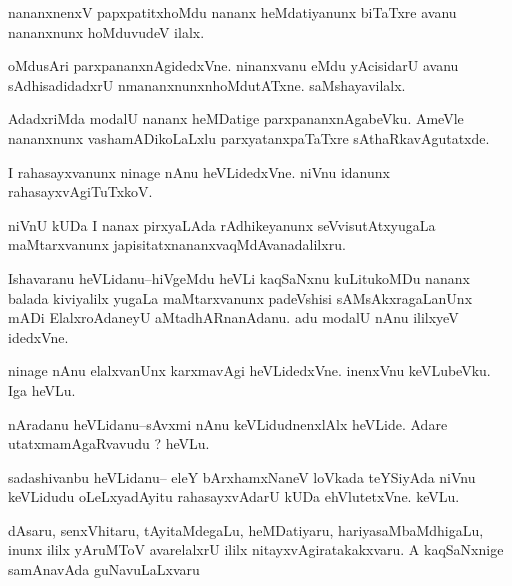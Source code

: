 \documentclass{article}
\begin{document}
\begin{mn}%
nananxnenxV papxpatitxhoMdu nananx heMdatiyanunx biTaTxre avanu nananxnunx hoMduvudeV ilalx.
\end{mn}

\begin{mn}%
oMdusAri parxpananxnAgidedxVne. ninanxvanu eMdu yAcisidarU avanu sAdhisadidadxrU 
nmananxnunxnhoMdutATxne. saMshayavilalx.
\end{mn}

\begin{mn}%
AdadxriMda modalU nananx heMDatige parxpananxnAgabeVku. AmeVle nananxnunx 
vashamADikoLaLxlu parxyatanxpaTaTxre sAthaRkavAgutatxde.
\end{mn}

\begin{mn}%
I rahasayxvanunx ninage nAnu heVLidedxVne. niVnu idanunx rahasayxvAgiTuTxkoV.
\end{mn}

\begin{mn}%
niVnU kUDa I  nanax pirxyaLAda rAdhikeyanunx seVvisutAtxyugaLa maMtarxvanunx 
japisitatxnananxvaqMdAvanadalilxru.
\end{mn}

\begin{mn}%
Ishavaranu heVLidanu--hiVgeMdu heVLi kaqSaNxnu kuLitukoMDu nananx balada kiviyalilx yugaLa 
maMtarxvanunx padeVshisi sAMsAkxragaLanUnx mADi ElalxroAdaneyU aMtadhARnanAdanu. adu 
modalU nAnu ililxyeV idedxVne.
\end{mn}

\begin{mn}%
ninage nAnu elalxvanUnx karxmavAgi heVLidedxVne. inenxVnu keVLubeVku. Iga heVLu.
\end{mn}


\begin{mn}%
nAradanu heVLidanu--sAvxmi nAnu keVLidudnenxlAlx heVLide. Adare utatxmamAgaRvavudu ? heVLu.
\end{mn}

\begin{mn}%
sadashivanbu heVLidanu-- eleY bArxhamxNaneV loVkada teYSiyAda niVnu keVLidudu 
oLeLxyadAyitu rahasayxvAdarU kUDa ehVlutetxVne. keVLu.
\end{mn}

\begin{mn}%
dAsaru, senxVhitaru, tAyitaMdegaLu, heMDatiyaru, hariyasaMbaMdhigaLu, inunx ililx yAruMToV 
avarelalxrU ililx nitayxvAgiratakakxvaru. A kaqSaNxnige samAnavAda guNavuLaLxvaru
\end{mn}
\end{document}
